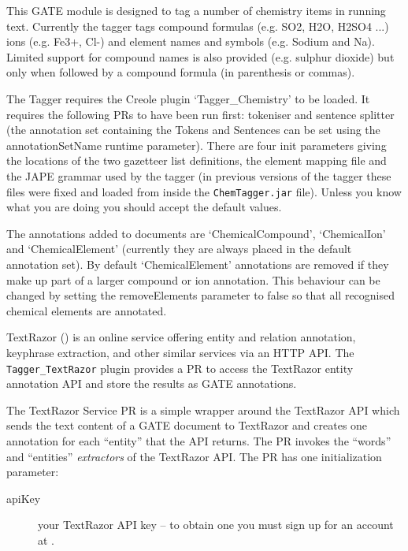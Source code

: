 
This GATE module is designed to tag a number of chemistry items in
running text. Currently the tagger tags compound formulas (e.g.
SO2, H2O, H2SO4 ...) ions (e.g. Fe3+, Cl-) and element names
and symbols (e.g. Sodium and Na). Limited support for compound names
is also provided (e.g. sulphur dioxide) but only when followed by
a compound formula (in parenthesis or commas).


The Tagger requires the Creole plugin `Tagger\_Chemistry' to be
loaded.  It requires the following PRs to have been run first:
tokeniser and sentence splitter (the annotation set containing the
Tokens and Sentences can be set using the annotationSetName runtime
parameter).  There are four init parameters giving the locations of 
the two gazetteer list definitions, the element mapping file and the
JAPE grammar used by the tagger (in previous versions of the tagger
these files were fixed and loaded from inside the {\tt ChemTagger.jar}
file).  Unless you know what you are doing you should accept the default
values.

The annotations added to documents are `ChemicalCompound', `ChemicalIon'
and `ChemicalElement' (currently they are always placed in the default
annotation set). By default `ChemicalElement' annotations are removed if they
make up part of a larger compound or ion annotation. This behaviour can be
changed by setting the removeElements parameter to false so that all recognised
chemical elements are annotated.


TextRazor () is an online service
offering entity and relation annotation, keyphrase extraction, and other
similar services via an HTTP API.  The \verb!Tagger_TextRazor! plugin provides
a PR to access the TextRazor entity annotation API and store the results as
GATE annotations.

The TextRazor Service PR is a simple wrapper around the TextRazor API which
sends the text content of a GATE document to TextRazor and creates one
annotation for each ``entity'' that the API returns.  The PR invokes the
``words'' and ``entities'' \emph{extractors} of the TextRazor API.  The PR has
one initialization parameter:
\begin{description}
\item[apiKey] your TextRazor API key -- to obtain one you must sign up for an
  account at .
\end{description}

